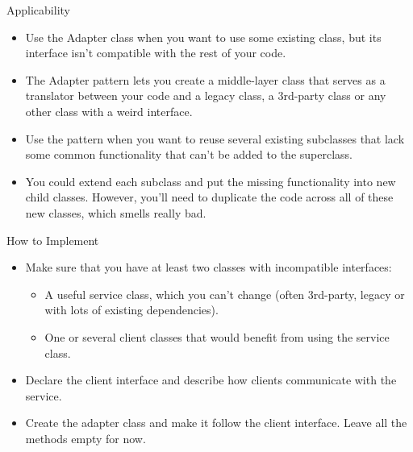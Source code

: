 \documentclass[13pt]{beamer}
\begin{document}
\begin{frame}{Applicability}
	\begin{itemize}
		\setlength\itemsep{1em}
		\item Use the Adapter class when you want to use some existing class, but its interface isn’t compatible with the rest of your code.
		\item The Adapter pattern lets you create a middle-layer class that serves as a translator between your code and a legacy class, a 3rd-party class or any other class with a weird interface.
		\item Use the pattern when you want to reuse several existing subclasses that lack some common functionality that can’t be added to the superclass.
		\item You could extend each subclass and put the missing functionality into new child classes. However, you’ll need to duplicate the code across all of these new classes, which smells really bad.
	\end{itemize}
\end{frame}

\begin{frame}{How to Implement}
	\begin{itemize}
		\setlength\itemsep{1em}
		\item Make sure that you have at least two classes with incompatible interfaces:
		\begin{itemize}
		\item A useful service class, which you can’t change (often 3rd-party, legacy or with lots of existing dependencies).
		\item One or several client classes that would benefit from using the service class.
		\end{itemize}
		\item Declare the client interface and describe how clients communicate with the service.
		\item Create the adapter class and make it follow the client interface. Leave all the methods empty for now.
	\end{itemize}
\end{frame}
\end{document}
